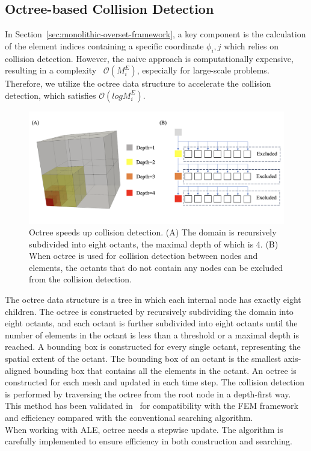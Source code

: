 \documentclass[preprint,12pt,sort&compress]{elsarticle}
\theoremstyle{definition}%
\begin{document}
\subsection{Octree-based Collision Detection}\label{sec:octree}
In Section~\ref{sec:monolithic-overset-framework}, a key component is the calculation of the element indices containing a specific coordinate 
$\phi_i,j$ which relies on collision detection. However, the naive approach is computationally expensive, resulting in a complexity
~$\mathcal{O}(M^E_i)$, especially for large-scale problems. Therefore, we utilize the octree data structure to accelerate the collision 
detection, which satisfies $\mathcal{O}(log M^E_i)$.\\
\begin{figure}[!htpb]
	\centering
	\includegraphics[angle=0,width=1.\textwidth]{fig/octree-diagram.png}
	\caption{Octree speeds up collision detection. (A) The domain is recursively subdivided into eight octants, the maximal depth of which
    is 4. (B) When octree is used for collision detection between nodes and elements, the octants that do not contain any nodes can be 
    excluded from the collision detection.}
	\label{fig:octree}
\end{figure}
The octree data structure is a tree in which each internal node has exactly eight children. The octree is constructed by
recursively subdividing the domain into eight octants, and each octant is further subdivided into eight octants until the number of elements
in the octant is less than a threshold or a maximal depth is reached. A bounding box is constructed for every single octant, representing the
spatial extent of the octant. The bounding box of an octant is the smallest axis-aligned bounding box that contains all the elements in the
octant. An octree is constructed for each mesh and updated in each time step. The collision detection is performed by traversing the octree
from the root node in a depth-first way. This method has been validated in~\cite{Xu16ig, zhu2020immersogeometric, zhao2022enriched} for compatibility with the FEM framework and efficiency compared with
the conventional searching algorithm. \\
When working with ALE, octree needs a stepwise update. The algorithm is carefully
implemented to ensure efficiency in both construction and searching.
\end{document}
